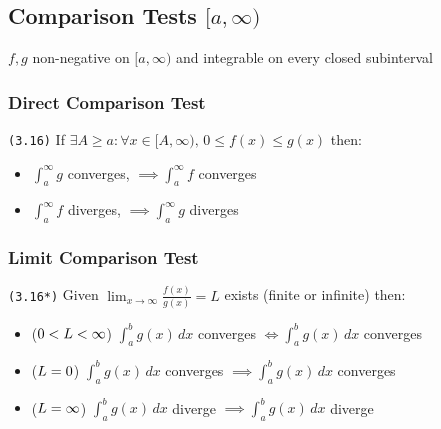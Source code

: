 \documentclass[a4paper,landscape]{article}
\newcommand{\tnum}[1]{{\color{gray}\footnotesize\texttt{(#1)}}}
\begin{document}
\begin{multicols}{2}
\section{Comparison Tests $[a,\infty)$}

$f,g$ non-negative on $[a,\infty)$ and integrable on every closed subinterval

\subsubsection{Direct Comparison Test}
\tnum{3.16} If $\exists A\geq a:\forall x\in[A,\infty),\,0\leq f(x)\leq g(x)$ then:

\begin{itemize}
    \item $\int ^\infty_{a} g$ converges, $\implies\int ^\infty_{a} f$ converges
    \item $\int ^\infty_{a} f$ diverges, $\implies\int ^\infty_{a} g$ diverges
\end{itemize}

\subsubsection{Limit Comparison Test}

\tnum{3.16*} Given $\displaystyle\lim_{ x \to \infty }\frac{f(x)}{g(x)}=L$ exists (finite or infinite) then:

\begin{itemize}
    \item ($\small 0<L<\infty$) $\int ^b_{a}g(x) \, dx$ converges  $\iff\int ^b_{a}g(x) \, dx$ converges
    \item ($\small L=0$) $\int ^b_{a}g(x) \, dx$ converges $\implies\int ^b_{a}g(x) \, dx$ converges
    \item ($\small L=\infty$) $\int ^b_{a}g(x) \, dx$ diverge $\implies\int ^b_{a}g(x) \, dx$ diverge
\end{itemize}

\end{multicols}
\end{document}
